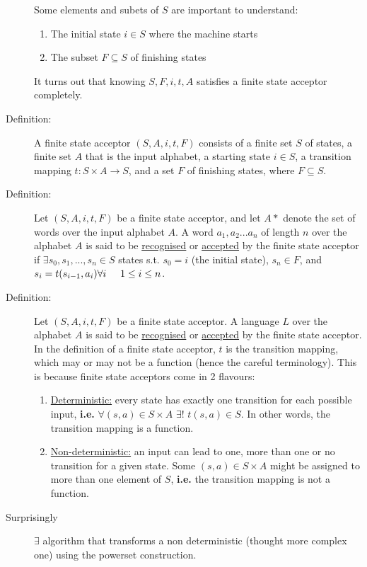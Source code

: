 \documentclass[10pt]{article}
\begin{document}
\begin{description}
		Some elements and subets of $S$ are important to understand:
		\begin{enumerate}
			\item The initial state $i \in S$ where the machine starts
			\item The subset $F \subseteq S$ of finishing states
		\end{enumerate}
		It turns out that knowing $S, F, i, t, A$ satisfies a finite state acceptor completely.
		\item[Definition:] A finite state acceptor $(S, A, i, t, F)$ consists of a finite set $S$ of states, a finite set $A$ that is the input alphabet, a starting state $i \in S$, a transition mapping $t: S \times A \rightarrow S$, and a set $F$ of finishing states, where $F \subseteq S$.
		\item[Definition:] Let $(S, A, i, t, F)$ be a finite state acceptor, and let $A*$ denote the set of words over the input alphabet $A$. A word $a_1, a_2...a_n$ of length $n$ over the alphabet $A$ is said to be \underline{recognised} or \underline{accepted} by the finite state acceptor if $\exists s_0, s_1, ..., s_n \in S$ states s.t. $s_0 = i$ (the initial state), $s_n \in F$, and $s_i = t(s_{i-1}, a_i) \forall i \hspace{5mm} 1 \leq i \leq n$.
		\item[Definition:] Let $(S, A, i, t, F)$ be a finite state acceptor. A language $L$ over the alphabet $A$ is said to be \underline{recognised} or \underline{accepted} by the finite state acceptor. \\
		In the definition of a finite state acceptor, $t$ is the transition mapping, which may or may not be a function (hence the careful terminology). This is because finite state acceptors come in 2 flavours:
		\begin{enumerate}
			\item \underline{Deterministic:} every state has exactly one transition for each possible input, \textbf{i.e.} $\forall (s, a) \in S \times A$ $\exists!$ $t(s, a) \in S$. In other words, the transition mapping is a function.
			\item \underline{Non-deterministic:} an input can lead to one, more than one or no transition for a given state. Some $(s, a) \in S \times A$ might be assigned to more than one element of $S$, \textbf{i.e.} the transition mapping is not a function.
		\end{enumerate}
		\item[Surprisingly] $\exists$ algorithm that transforms a non deterministic (thought more complex one) using the powerset construction. \\

\end{description}
\end{document}
